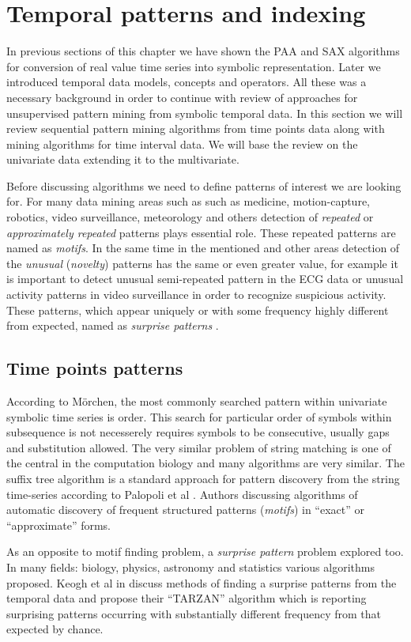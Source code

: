 \section{Temporal patterns and indexing} \label{tpatterns}
In previous sections of this chapter we have shown the PAA and SAX algorithms for conversion of real value time series into symbolic representation. Later we introduced temporal data models, concepts and operators. All these was a necessary background in order to continue with review of approaches for unsupervised pattern mining from symbolic temporal data. In this section we will review sequential pattern mining algorithms from time points data along with mining algorithms for time interval data. We will base the review on the univariate data extending it to the multivariate.

Before discussing algorithms we need to define patterns of interest we are looking for. For many data mining areas such as such as medicine, motion-capture, robotics, video surveillance, meteorology and others detection of \textit{repeated} or \textit{approximately repeated} patterns plays essential role. These repeated patterns are named as \textit{motifs}. In the same time in the mentioned and other areas detection of the \textit{unusual} (\textit{novelty}) patterns has the same or even greater value, for example it is important to detect unusual semi-repeated pattern in the ECG data or unusual activity patterns in video surveillance in order to recognize suspicious activity. These patterns, which appear uniquely or with some frequency highly different from expected, named as \textit{surprise patterns} \cite{citeulike:3025877}.


\subsection{Time points patterns}
According to M\"orchen, the most commonly searched pattern within univariate symbolic time series is order. This search for particular order of symbols within subsequence is not necesserely requires symbols to be consecutive, usually gaps and substitution allowed. The very similar problem of string matching is one of the central in the computation biology \cite{citeulike:465665} and many algorithms are very similar. The suffix tree algorithm is a standard approach for pattern discovery from the string time-series according to Palopoli et al \cite{citeulike:5003338}. Authors discussing algorithms of automatic discovery of frequent structured patterns (\textit{motifs}) in ``exact'' or ``approximate'' forms. 

As an opposite to motif finding problem, a \textit{surprise pattern} problem explored too. In many fields: biology, physics, astronomy and statistics various algorithms proposed. Keogh et al in \cite{citeulike:3025877} discuss methods of finding a surprise patterns from the temporal data and propose their ``TARZAN'' algorithm which is reporting surprising patterns occurring with substantially different frequency from that expected by chance.
